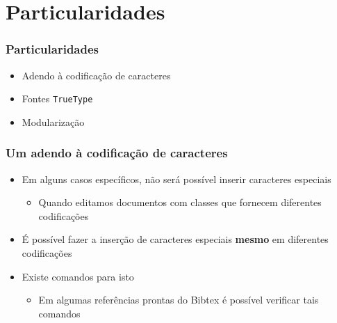 \section{Particularidades}

\begin{frame}[fragile] \frametitle{Particularidades}

\begin{itemize}
	\item Adendo à codificação de caracteres
	\item Fontes \texttt{TrueType}
	\item Modularização
\end{itemize}

\end{frame}

\begin{frame}[fragile] \frametitle{Um adendo à codificação de caracteres}
\begin{itemize}
	\item Em alguns casos específicos, não será possível inserir caracteres especiais
	\begin{itemize}
		\item Quando editamos documentos com classes que fornecem diferentes codificações
	\end{itemize}
	\item É possível fazer a inserção de caracteres especiais \textbf{mesmo} em diferentes codificações
	\item Existe comandos para isto
	\begin{itemize}
		\item Em algumas referências prontas do Bibtex é possível verificar tais comandos
	\end{itemize}
\end{itemize}
\end{frame}

